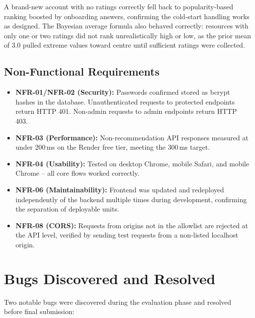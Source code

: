 \documentclass[12pt,a4paper]{report}
\begin{document}
A brand-new account with no ratings correctly fell back to popularity-based ranking boosted by onboarding answers, confirming the cold-start handling works as designed. The Bayesian average formula also behaved correctly: resources with only one or two ratings did not rank unrealistically high or low, as the prior mean of 3.0 pulled extreme values toward centre until sufficient ratings were collected.

\subsection{Non-Functional Requirements}

\begin{itemize}
  \item \textbf{NFR-01/NFR-02 (Security):} Passwords confirmed stored as bcrypt hashes in the database. Unauthenticated requests to protected endpoints return HTTP 401. Non-admin requests to admin endpoints return HTTP 403.
  \item \textbf{NFR-03 (Performance):} Non-recommendation API responses measured at under 200\,ms on the Render free tier, meeting the 300\,ms target.
  \item \textbf{NFR-04 (Usability):} Tested on desktop Chrome, mobile Safari, and mobile Chrome -- all core flows worked correctly.
  \item \textbf{NFR-06 (Maintainability):} Frontend was updated and redeployed independently of the backend multiple times during development, confirming the separation of deployable units.
  \item \textbf{NFR-08 (CORS):} Requests from origins not in the allowlist are rejected at the API level, verified by sending test requests from a non-listed localhost origin.
\end{itemize}

\section{Bugs Discovered and Resolved}
\label{sec:results-bugs}

Two notable bugs were discovered during the evaluation phase and resolved before final submission:
\end{document}
